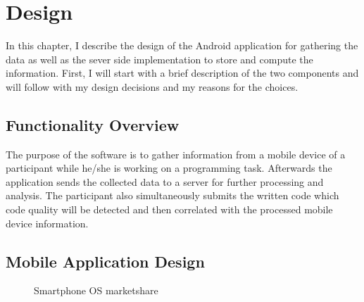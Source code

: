 \chapter{Design}

\begin{flushleft}
In this chapter, I describe the design of the Android application for gathering the data as well as the sever side implementation to store and compute the information. 
First, I will start with a brief description of the two components and will follow with my design decisions and my reasons for the choices. 
\end{flushleft}

\section{Functionality Overview}
The purpose of the software is to gather information from a mobile device of a participant while he/she is working on a programming task. Afterwards the application sends the collected data to a server for further processing and analysis. The participant also simultaneously submits the written code which code quality will be detected and then correlated with the processed mobile device information. 


\section{Mobile Application Design}

%

\begin{figure}
	\centering
 	\caption{Smartphone OS marketshare}\label{result}
 	\vspace{10 mm}
\end{figure}

